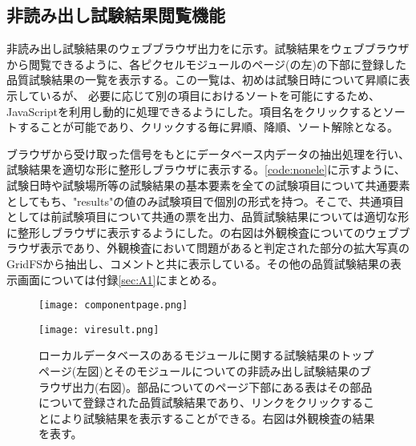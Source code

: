 \subsection{非読み出し試験結果閲覧機能}
\label{sec:non-elec-view}

非読み出し試験結果のウェブブラウザ出力をに示す。試験結果をウェブブラウザから閲覧できるように、各ピクセルモジュールのページ(の左)の下部に登録した品質試験結果の一覧を表示する。この一覧は、初めは試験日時について昇順に表示しているが、
必要に応じて別の項目におけるソートを可能にするため、JavaScriptを利用し動的に処理できるようにした。項目名をクリックするとソートすることが可能であり、クリックする毎に昇順、降順、ソート解除となる。

ブラウザから受け取った信号をもとにデータベース内データの抽出処理を行い、試験結果を適切な形に整形しブラウザに表示する。\cref{code:nonele}に示すように、試験日時や試験場所等の試験結果の基本要素を全ての試験項目について共通要素としてもち、"results"の値のみ試験項目で個別の形式を持つ。そこで、共通項目としては前試験項目について共通の票を出力、品質試験結果については適切な形に整形しブラウザに表示するようにした。の右図は外観検査についてのウェブブラウザ表示であり、外観検査において問題があると判定された部分の拡大写真のGridFSから抽出し、コメントと共に表示している。その他の品質試験結果の表示画面については付録\ref{sec:A1}にまとめる。

\begin{figure}[tbp]
  \begin{minipage}[b]{0.45\linewidth}
    \centering
    \texttt{[image: componentpage.png]}
  \end{minipage}
  \begin{minipage}[b]{0.45\linewidth}
    \centering
    \texttt{[image: viresult.png]}
  \end{minipage}
    \caption[非読み出し試験結果のブラウザ出力]{ローカルデータベースのあるモジュールに関する試験結果のトップページ(左図)とそのモジュールについての非読み出し試験結果のブラウザ出力(右図)。部品についてのページ下部にある表はその部品について登録された品質試験結果であり、リンクをクリックすることにより試験結果を表示することができる。右図は外観検査の結果を表す。}
    \label{fig:noneleresult}
\end{figure}

